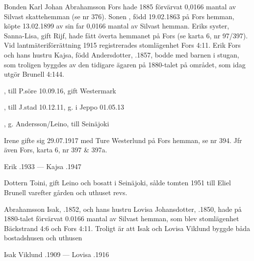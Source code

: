 Bonden Karl Johan Abrahamsson Fors hade 1885 förvärvat 0,0166 mantal av Silvast skattehemman (se nr 376).
Sonen , född 19.02.1863 på Fors hemman, köpte 13.02.1899 av sin far 0,0166 mantal av Silvast hemman. Eriks syster, Sanna-Lisa, gift Rijf, hade fått överta hemmanet på Fors (se karta 6, nr 97/397). Vid lantmäteriförrättning 1915 registrerades stomlägenhet Fors 4:11. Erik Fors och hans hustru Kajsa, född Andersdotter, .1857, bodde med barnen i stugan, som troligen byggdes av den tidigare ägaren på 1880-talet på området, som idag utgör Brunell 4:144.
\begin{jhchildren}
  \item {}
  \item {}, till P.söre 10.09.16, gift Westermark
  \item {}, till J.stad 10.12.11, g. i Jeppo 01.05.13
  \item {}, g. Andersson/Leino, till Seinäjoki
\end{jhchildren}
Irene gifte sig 29.07.1917 med Ture Westerlund på Fors hemman, se nr 394. Jfr även Fors, karta 6, nr 397 \& 397a.

Erik .1933  ---  Kajsa .1947

Dottern Toini, gift Leino och bosatt i Seinäjoki, sålde tomten 1951 till Eliel Brunell varefter gården och uthuset revs.


 Abrahamsson Isak, .1852, och hans hustru Lovisa Johansdotter, .1850, hade på 1880-talet förvärvat 0.0166 mantal av Silvast hemman, som blev stomlägenhet Bäckstrand 4:6 och Fors 4:11. Troligt är att Isak och Lovisa Viklund byggde båda bostadshusen och uthusen
\begin{jhchildren}
  \item {}
  \item {}
  \item {}
\end{jhchildren}

Isak Viklund .1909  ---  Lovisa .1916



